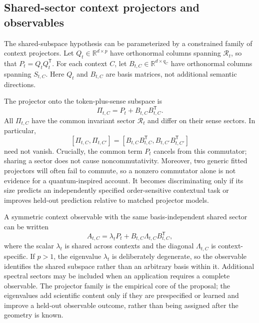 \documentclass[
  aps,
  reprint,
  superscriptaddress,
  floatfix,
  nofootinbib,
  longbibliography
]{revtex4-2}
\newcommand{\R}{\mathbb{R}}
\newcommand{\T}{^{\mathsf{T}}}
\begin{document}
\subsection{Shared-sector context projectors and observables}
\label{sec:observables}

The shared-subspace hypothesis can be parameterized by a constrained family
of context projectors.  Let $Q_t\in\R^{d\times p}$ have orthonormal columns
spanning $\mathcal R_t$, so that $P_t=Q_tQ_t\T$.  For each context $C$, let
$B_{t,C}\in\R^{d\times q_C}$ have orthonormal columns spanning $S_{t,C}$.
Here $Q_t$ and $B_{t,C}$ are basis matrices, not additional semantic
directions.

The projector onto the token-plus-sense subspace is
%
\begin{equation}
\label{eq:context-projector}
\Pi_{t,C}=P_t+B_{t,C}B_{t,C}\T .
\end{equation}
%
All $\Pi_{t,C}$ have the common invariant sector $\mathcal R_t$ and differ on
their sense sectors.  In particular,
%
\begin{equation}
\label{eq:projector-commutator}
[\Pi_{t,C},\Pi_{t,C'}]
=
[B_{t,C}B_{t,C}\T,B_{t,C'}B_{t,C'}\T]
\end{equation}
%
need not vanish.  Crucially, the common term $P_t$ cancels from this
commutator; sharing a sector does not cause noncommutativity.  Moreover, two
generic fitted projectors will often fail to commute, so a nonzero commutator
alone is not evidence for a quantum-inspired account.  It becomes
discriminating only if its size predicts an independently specified
order-sensitive contextual task or improves held-out prediction relative to
matched projector models.

A symmetric context observable with the same basis-independent shared sector
can be written
%
\begin{equation}
\label{eq:context-observable}
A_{t,C}
=\lambda_t P_t
 +B_{t,C}\Lambda_{t,C}B_{t,C}\T,
\end{equation}
%
where the scalar $\lambda_t$ is shared across contexts and the diagonal
$\Lambda_{t,C}$ is context-specific.  If $p>1$, the eigenvalue $\lambda_t$ is
deliberately degenerate, so the observable identifies the shared subspace
rather than an arbitrary basis within it.  Additional spectral sectors may be
included when an application requires a complete observable.  The projector
family is the empirical core of the proposal; the eigenvalues add scientific
content only if they are prespecified or learned and improve a held-out
observable outcome, rather than being assigned after the geometry is known.
\end{document}
